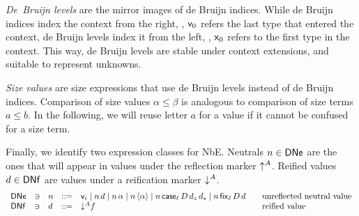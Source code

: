 \documentclass[acmsmall,screen]{acmart}\settopmatter{}
\begin{document}
\emph{De~Bruijn levels} are the mirror images of de Bruijn indices.  While de Bruijn
indices index the context from the right, \ie, $\mathsf{v}_{0}$ refers the
last type that entered the context, de Bruijn levels index it from the
left, \ie, $\mathsf{x}_{0}$ refers to the first type in the context.  This
way, de Bruijn levels are stable under context extensions, and
suitable to represent unknowns.

\emph{Size values} \fbox{$\alpha, \beta \in \SIZE$} are size
expressions that use de Bruijn levels instead of de Bruijn
indices. Comparison of size values $\alpha \leq \beta$ is
analogous to comparison of size terms $a \leq b$.  In the following, we
will reuse letter $a$ for a value if it cannot be confused for a size
term.

Finally, we identify two expression classes for NbE. Neutrals
$n \in \mathsf{DNe}$ are the ones that will appear in values under the
reflection marker $\mathord{\uparrow^{A}}$.  Reified values $d \in \mathsf{DNf}$ are values
under a reification marker $\mathord{\downarrow^{A}}$.
\[
\begin{array}{lllll@{\qquad}l}
  \DNe & \ni &
  n & ::= & \ind i \mid n\,d \mid n\,\alpha \mid n\,\ann \alpha \mid
            n\,\case[\ell] D{d_z}{d_s} \mid n\,\fix[\ell] D d
    & \mbox{unreflected neutral value} \\
  \DNf & \ni &
  d & ::= & \down A f
    & \mbox{reified value} \\
\end{array}
\]
\end{document}
